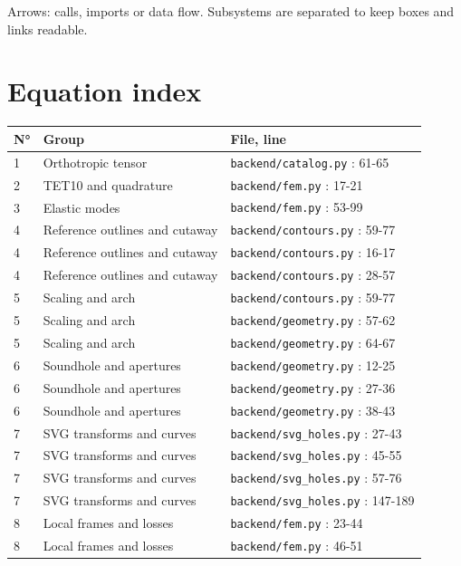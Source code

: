 \documentclass[10pt,a4paper]{article}
\begin{document}
Arrows: calls, imports or data flow. Subsystems are separated to keep boxes and links readable.\par
\begin{center}\end{center}
\clearpage\section{Equation index}
\small\begin{longtable}{p{8mm}p{75mm}p{65mm}}\toprule N° & Group & File, line \\ \midrule\endhead
1 & Orthotropic tensor & \texttt{backend/catalog.py} : 61-65\\[3pt]
2 & TET10 and quadrature & \texttt{backend/fem.py} : 17-21\\[3pt]
3 & Elastic modes & \texttt{backend/fem.py} : 53-99\\[3pt]
4 & Reference outlines and cutaway & \texttt{backend/contours.py} : 59-77\\[3pt]
4 & Reference outlines and cutaway & \texttt{backend/contours.py} : 16-17\\[3pt]
4 & Reference outlines and cutaway & \texttt{backend/contours.py} : 28-57\\[3pt]
5 & Scaling and arch & \texttt{backend/contours.py} : 59-77\\[3pt]
5 & Scaling and arch & \texttt{backend/geometry.py} : 57-62\\[3pt]
5 & Scaling and arch & \texttt{backend/geometry.py} : 64-67\\[3pt]
6 & Soundhole and apertures & \texttt{backend/geometry.py} : 12-25\\[3pt]
6 & Soundhole and apertures & \texttt{backend/geometry.py} : 27-36\\[3pt]
6 & Soundhole and apertures & \texttt{backend/geometry.py} : 38-43\\[3pt]
7 & SVG transforms and curves & \texttt{backend/svg\_holes.py} : 27-43\\[3pt]
7 & SVG transforms and curves & \texttt{backend/svg\_holes.py} : 45-55\\[3pt]
7 & SVG transforms and curves & \texttt{backend/svg\_holes.py} : 57-76\\[3pt]
7 & SVG transforms and curves & \texttt{backend/svg\_holes.py} : 147-189\\[3pt]
8 & Local frames and losses & \texttt{backend/fem.py} : 23-44\\[3pt]
8 & Local frames and losses & \texttt{backend/fem.py} : 46-51\\[3pt]

\end{longtable}
\end{document}
